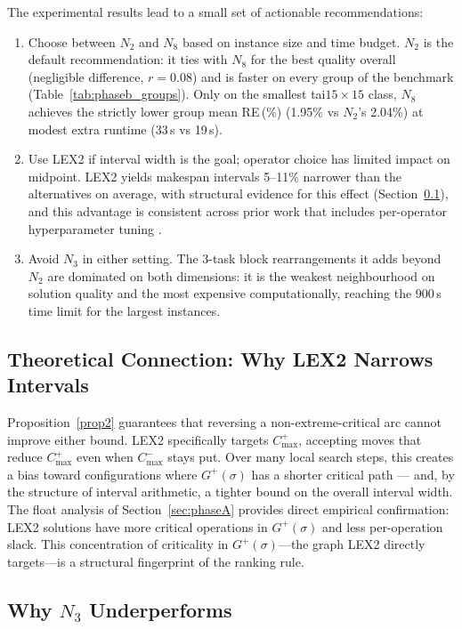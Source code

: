 \documentclass[preprint,12pt]{elsarticle}
\begin{document}
The experimental results lead to a small set of actionable recommendations:
\begin{enumerate}
\item Choose between $N_2$ and $N_8$ based on instance size and time budget. $N_2$ is the default recommendation: it ties with $N_8$ for the best quality overall (negligible difference, $r = 0.08$) and is faster on every group of the benchmark (Table~\ref{tab:phaseb_groups}). Only on the smallest tai$15{\times}15$ class, $N_8$ achieves the strictly lower group mean RE\,(\%) (1.95\% vs $N_2$'s 2.04\%) at modest extra runtime (33\,s vs 19\,s).
\item Use LEX2 if interval width is the goal; operator choice has limited impact on midpoint. LEX2 yields makespan intervals 5--11\% narrower than the alternatives on average, with structural evidence for this effect (Section~\ref{sec:lex2-width}), and this advantage is consistent across prior work that includes per-operator hyperparameter tuning \cite{DiazICAE2023,DiazIGPL2022}.
\item Avoid $N_3$ in either setting. The 3-task block rearrangements it adds beyond $N_2$ are dominated on both dimensions: it is the weakest neighbourhood on solution quality and the most expensive computationally, reaching the 900\,s time limit for the largest instances.
\end{enumerate}

\subsection{Theoretical Connection: Why LEX2 Narrows Intervals}
\label{sec:lex2-width}

Proposition~\ref{prop2} guarantees that reversing a non-extreme-critical arc cannot improve either bound. LEX2 specifically targets $C^+_{\max}$, accepting moves that reduce $C^+_{\max}$ even when $C^-_{\max}$ stays put. Over many local search steps, this creates a bias toward configurations where $G^+(\sigma)$ has a shorter critical path --- and, by the structure of interval arithmetic, a tighter bound on the overall interval width. The float analysis of Section~\ref{sec:phaseA} provides direct empirical confirmation: LEX2 solutions have more critical operations in $G^+(\sigma)$ and less per-operation slack. This concentration of criticality in $G^+(\sigma)$---the graph LEX2 directly targets---is a structural fingerprint of the ranking rule.

\subsection{Why $N_3$ Underperforms}
\label{sec:N3-underperforms}
\end{document}
